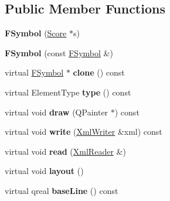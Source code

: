 \subsection*{Public Member Functions}
\begin{DoxyCompactItemize}
\item 
\mbox{\label{class_ms_1_1_f_symbol_a5feac8b09f4aa66e16727bcba6c38577}} 
{\bfseries F\+Symbol} (\hyperlink{class_ms_1_1_score}{Score} $\ast$s)
\item 
\mbox{\label{class_ms_1_1_f_symbol_a74362dff04196c024d21af8672b11b52}} 
{\bfseries F\+Symbol} (const \hyperlink{class_ms_1_1_f_symbol}{F\+Symbol} \&)
\item 
\mbox{\label{class_ms_1_1_f_symbol_a5511286977d51082b9a16adb8781fdd7}} 
virtual \hyperlink{class_ms_1_1_f_symbol}{F\+Symbol} $\ast$ {\bfseries clone} () const
\item 
\mbox{\label{class_ms_1_1_f_symbol_af65747610029002aca9b77ec7aa75c80}} 
virtual Element\+Type {\bfseries type} () const
\item 
\mbox{\label{class_ms_1_1_f_symbol_ab0b504680d90b4a36f0b738bbfce883e}} 
virtual void {\bfseries draw} (Q\+Painter $\ast$) const
\item 
\mbox{\label{class_ms_1_1_f_symbol_ac0ad0d3d6d4164086efc1419baced71b}} 
virtual void {\bfseries write} (\hyperlink{class_ms_1_1_xml_writer}{Xml\+Writer} \&xml) const
\item 
\mbox{\label{class_ms_1_1_f_symbol_a8e78bb0a554a53359437eb3541a567bc}} 
virtual void {\bfseries read} (\hyperlink{class_ms_1_1_xml_reader}{Xml\+Reader} \&)
\item 
\mbox{\label{class_ms_1_1_f_symbol_a4620d9e44c91b3726816cd6676a4497e}} 
virtual void {\bfseries layout} ()
\item 
\mbox{\label{class_ms_1_1_f_symbol_ae63ddf40343e37694b5d985f5c0b4957}} 
virtual qreal {\bfseries base\+Line} () const
\item 

\end{DoxyCompactItemize}
